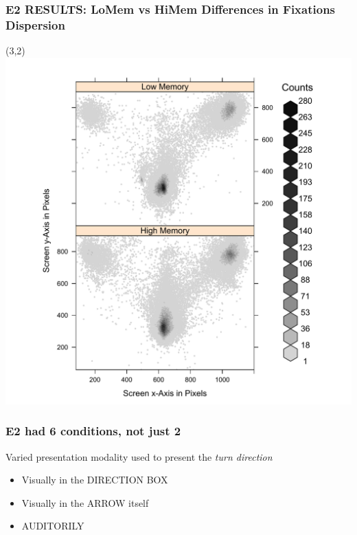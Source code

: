 \documentclass{beamer}
\begin{document}
\begin{frame} 
	\frametitle{E2 RESULTS: LoMem vs HiMem Differences in Fixations Dispersion}
	  \begin{textblock}{5.5}(3,2)	
  		\includegraphics[scale=.45]{../zNvBkFigs/Rplot_r7_hexbinplot_db}
    	  \end{textblock} 
\end{frame}

\begin{frame}
	\frametitle{E2 had 6 conditions, not just 2}
	Varied presentation modality used to present the \emph{turn direction}
	\begin{itemize}
		\item Visually in the DIRECTION BOX
		\item Visually in the ARROW itself 
		\item AUDITORILY
	\end{itemize}

\end{frame}
\end{document}
